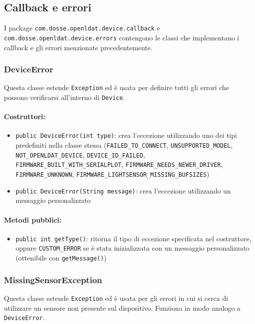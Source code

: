 \subsection{Callback e errori}
I package \texttt{com.dosse.openldat.device.callback} e \texttt{com.dosse.openldat.device.errors} contengono le classi che implementano i callback e gli errori menzionate precedentemente.

\subsubsection{DeviceError}
Questa classe estende \texttt{Exception} ed è usata per definire tutti gli errori che possono verificarsi all'interno di \texttt{Device}.

\paragraph{Costruttori:}\begin{itemize}
	\item \texttt{public DeviceError(int type)}: crea l'eccezione utilizzando uno dei tipi predefiniti nella classe stessa (\texttt{FAILED\_TO\_CONNECT}, \texttt{UNSUPPORTED\_MODEL}, \texttt{NOT\_OPENLDAT\_DEVICE}, \texttt{DEVICE\_ID\_FAILED}, \texttt{FIRMWARE\_BUILT\_WITH\_SERIALPLOT}, \texttt{FIRMWARE\_NEEDS\_NEWER\_DRIVER}, \texttt{FIRMWARE\_UNKNOWN}, \texttt{FIRMWARE\_LIGHTSENSOR\_MISSING\_BUFSIZES})
	\item \texttt{public DeviceError(String message)}: crea l'eccezione utilizzando un messaggio personalizzato
\end{itemize}

\paragraph{Metodi pubblici:}\begin{itemize}
	\item \texttt{public int getType()}: ritorna il tipo di eccezione specificata nel costruttore, oppure \texttt{CUSTOM\_ERROR} se è stata inizializzata con un messaggio personalizzato (ottenibile con \texttt{getMessage()})
\end{itemize}

\subsubsection{MissingSensorException}
Questa classe estende \texttt{Exception} ed è usata per gli errori in cui si cerca di utilizzare un sensore non presente sul dispositivo. Funziona in modo analogo a \texttt{DeviceError}.

